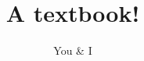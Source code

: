 \documentclass[letterpaper, 10pt]{memoir}
\begin{document}
\frontmatter
\title{A textbook!} 
\author{You & I}
\date{}


\tableofcontents

\mainmatter 


%

\printindex
\end{document}
